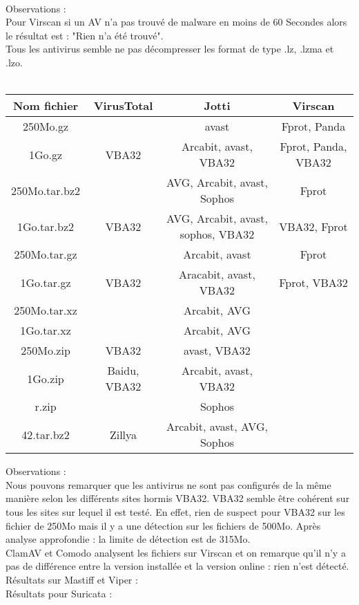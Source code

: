 \documentclass[smallextended]{svjour3}       %
\begin{document}
$ $\\
\\
Observations :\\
Pour Virscan si un AV n'a pas trouvé de malware en moins de 60 Secondes alors le résultat est : "Rien n'a été trouvé".\\
Tous les antivirus semble ne pas décompresser les format de type .lz, .lzma et .lzo.
$ $\\
\\
\begin{tabular}{|c|c|c|c|}
    \hline
     \textbf{Nom fichier} & \textbf{VirusTotal} & \textbf{Jotti} & \textbf{Virscan} \\
     \hline
    250Mo.gz &  & avast & Fprot, Panda\\
    \hline
    1Go.gz & VBA32 & Arcabit, avast, VBA32 & Fprot, Panda, VBA32\\
    \hline
    \hline
    250Mo.tar.bz2 & & AVG, Arcabit, avast, Sophos & Fprot\\
    \hline
    1Go.tar.bz2 & VBA32 & AVG, Arcabit, avast, sophos, VBA32 & VBA32, Fprot\\
    \hline
    \hline
    250Mo.tar.gz & & Arcabit, avast & Fprot\\
    \hline
    1Go.tar.gz & VBA32 & Aracabit, avast, VBA32 & Fprot, VBA32\\
    \hline
    \hline
    250Mo.tar.xz & & Arcabit, AVG & \\
    \hline
    1Go.tar.xz & & Arcabit, AVG & \\
    \hline
    \hline
    250Mo.zip & VBA32 & avast, VBA32 & \\
    \hline
    1Go.zip & Baidu, VBA32 & Arcabit, avast, VBA32 & \\
    \hline
    r.zip &  & Sophos  & \\
    \hline
    \hline
    42.tar.bz2 & Zillya & Arcabit, avast, AVG, Sophos  & \\
    \hline
\end{tabular}
$ $\\
Observations :\\
Nous pouvons remarquer que les antivirus ne sont pas configurés de la même manière selon les différents sites hormis VBA32. VBA32 semble être cohérent sur tous les sites sur lequel il est testé. En effet, rien de suspect pour VBA32 sur les fichier de 250Mo mais il y a une détection sur les fichiers de 500Mo. Après analyse approfondie : la limite de détection est de 315Mo.\\
ClamAV et Comodo analysent les fichiers sur Virscan et on remarque qu'il n'y a pas de différence entre la version installée et la version online : rien n'est détecté.\\
$ $\\
Résultats sur Mastiff et Viper :\\
$ $\\
Résultats pour Suricata :\\
\end{document}
